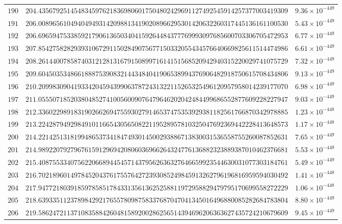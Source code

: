 \documentclass[12pt,reqno]{amsart}
\theoremstyle{remark}
\begin{document}
\begin{longtable}{clc}
$190$ & $204.4356792514548345976218369806017504802429691127492545914257377003419309$ & $9.36\times 10^{-449}$ \\
$191$ & $206.0089656104940494931420988134190208966295301420632260317445136161100530$ & $5.43\times 10^{-449}$ \\
$192$ & $206.6965947533859217906136503404159264484377769993097685600703306705472953$ & $6.77\times 10^{-449}$ \\
$193$ & $207.8542758282939310672911502849075677150332055434576640669825611514474986$ & $6.61\times 10^{-449}$ \\
$194$ & $208.2614400785874031212813167915089971614151568520942940315220029741075729$ & $7.32\times 10^{-449}$ \\
$195$ & $209.6045035348661888753908321443484041906538994376906482918750615708434806$ & $9.13\times 10^{-449}$ \\
$196$ & $210.2099830904193342045943990637872431322115265325496120957958014239177070$ & $6.98\times 10^{-449}$ \\
$197$ & $211.0555071852038048527410056009076479646202042484499686552877609228227947$ & $9.03\times 10^{-449}$ \\
$198$ & $212.3360229891831902662694755930279146537475353929381182561766870342978885$ & $1.23\times 10^{-448}$ \\
$199$ & $213.2242879492984910116654305650822119528957810325047692369442228413648573$ & $1.17\times 10^{-448}$ \\
$200$ & $214.2214251318199486537341847493014500293886713830031536558755260087852631$ & $7.65\times 10^{-449}$ \\
$201$ & $214.9892207927967615912969420806036966264324776136882323889387010462376681$ & $5.53\times 10^{-449}$ \\
$202$ & $215.4087553340756220668944545714379562636327646659923544630031077303184761$ & $5.49\times 10^{-449}$ \\
$203$ & $216.7021896014978452043761755764272393085249845913262796196816959594030492$ & $1.41\times 10^{-448}$ \\
$204$ & $217.9477218039185978585178433135613625258811972958829479795170699558272229$ & $1.06\times 10^{-448}$ \\
$205$ & $218.6393351123789842921765578098758337687047041345016496880085282684783804$ & $8.80\times 10^{-449}$ \\
$206$ & $219.5862472113710835884260481589200286256514394696206363627435724210679609$ & $9.45\times 10^{-449}$ \\

\end{longtable}
\end{document}
